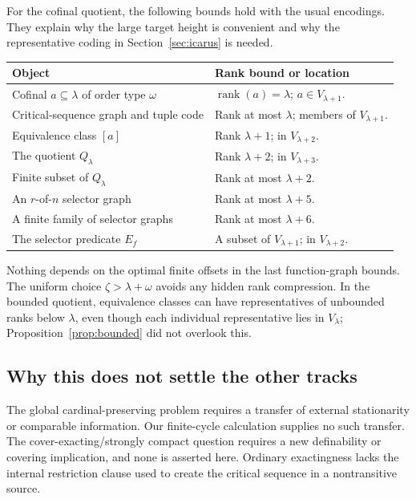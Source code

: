 \documentclass[11pt,letterpaper]{article}
\theoremstyle{definition}
\newcommand{\rank}{\operatorname{rank}}
\begin{document}
For the cofinal quotient, the following bounds hold with the usual encodings. They explain why the large target height is convenient and why the representative coding in Section~\ref{sec:icarus} is needed.
\begin{center}
\renewcommand{\arraystretch}{1.12}
\begin{tabularx}{\textwidth}{@{}P{.47\textwidth}Y@{}}
\toprule
\textbf{Object}&\textbf{Rank bound or location}\\\midrule
Cofinal $a\subseteq\lambda$ of order type $\omega$ & $\rank(a)=\lambda$; $a\in V_{\lambda+1}$.\\
Critical-sequence graph and tuple code & Rank at most $\lambda$; members of $V_{\lambda+1}$.\\
Equivalence class $[a]$ & Rank $\lambda+1$; in $V_{\lambda+2}$.\\
The quotient $Q_\lambda$ & Rank $\lambda+2$; in $V_{\lambda+3}$.\\
Finite subset of $Q_\lambda$ & Rank at most $\lambda+2$.\\
An $r$-of-$n$ selector graph & Rank at most $\lambda+5$.\\
A finite family of selector graphs & Rank at most $\lambda+6$.\\
The selector predicate $E_f$ & A subset of $V_{\lambda+1}$; in $V_{\lambda+2}$.\\
\bottomrule
\end{tabularx}
\end{center}

Nothing depends on the optimal finite offsets in the last function-graph bounds. The uniform choice $\zeta>\lambda+\omega$ avoids any hidden rank compression. In the bounded quotient, equivalence classes can have representatives of unbounded ranks below $\lambda$, even though each individual representative lies in $V_\lambda$; Proposition~\ref{prop:bounded} did not overlook this.

\subsection{Why this does not settle the other tracks}

The global cardinal-preserving problem requires a transfer of external stationarity or comparable information. Our finite-cycle calculation supplies no such transfer. The cover-exacting/strongly compact question requires a new definability or covering implication, and none is asserted here. Ordinary exactingness lacks the internal restriction clause used to create the critical sequence in a nontransitive source.
\end{document}
